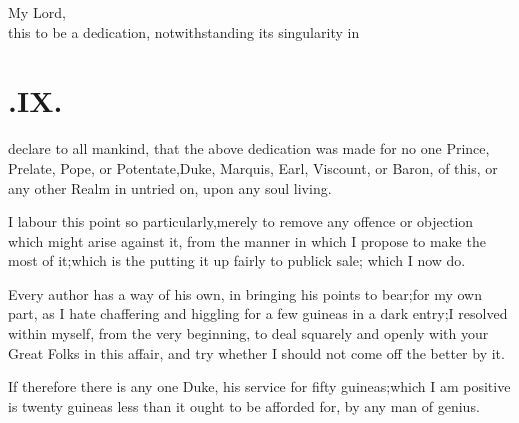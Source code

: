 \documentclass{article}
\begin{document}
My Lord,\\[-24pt]
 this to
be a dedication,\break
notwithstanding its singularity in\break
{}

\noindent{}
\vskip 36pt
\newpage
\null
\section{.\enspace IX.}

 declare to all mankind,
that the above dedication was made for no one Prince, Prelate,
Pope, or Potentate,\tsk Duke, Marquis, Earl, Viscount, or Baron, of this, or any
other Realm in\break
{} 
untried on, upon any soul living.

I labour this point so particularly,\break merely to remove any
offence or objection which might arise against it, from the manner
in which I propose to make the most of it;\tsk which is the
putting it up fairly to publick sale; which I now do.

\tsh Every author has a way of his
own, in bringing his points to bear;\tsk for
my own part, as I hate chaffering and
higgling for a few guineas in a dark\break
entry;\tsk I resolved within myself, from
the very beginning, to deal squarely and 
openly with your Great Folks in this affair, 
and try whether I should not come
off the better by it.

If therefore there is any one Duke, 
his service for fifty guineas;\tsh which
I am positive is twenty guineas less
than it ought to be afforded for, by any man of genius.
\end{document}
